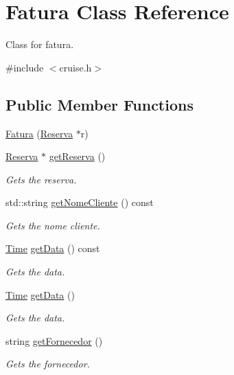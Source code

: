 \hypertarget{classFatura}{}\section{Fatura Class Reference}
\label{classFatura}


Class for fatura.  




{\ttfamily \#include $<$cruise.\+h$>$}

\subsection*{Public Member Functions}
\begin{DoxyCompactItemize}
\item 
\hyperlink{classFatura_a1f07f69dca302332c03e605c91df8c90}{Fatura} (\hyperlink{classReserva}{Reserva} $\ast$r)
\item 
\hyperlink{classReserva}{Reserva} $\ast$ \hyperlink{classFatura_aec7c7eb1220972655cd5318cae9a8b58}{get\+Reserva} ()
\begin{DoxyCompactList}\small\item\em Gets the reserva. \end{DoxyCompactList}\item 
std\+::string \hyperlink{classFatura_aa16421065127ac0fd15740b80dd1893b}{get\+Nome\+Cliente} () const 
\begin{DoxyCompactList}\small\item\em Gets the nome cliente. \end{DoxyCompactList}\item 
\hyperlink{classTime}{Time} \hyperlink{classFatura_af7d5b6d4f800887742a7bb1adbfecc65}{get\+Data} () const 
\begin{DoxyCompactList}\small\item\em Gets the data. \end{DoxyCompactList}\item 
\hyperlink{classTime}{Time} \hyperlink{classFatura_a8eb6e932de3351b6fca24e58397b02c6}{get\+Data} ()
\begin{DoxyCompactList}\small\item\em Gets the data. \end{DoxyCompactList}\item 
string \hyperlink{classFatura_a45efe8240f7ffc339ed1a34b2f928465}{get\+Fornecedor} ()
\begin{DoxyCompactList}\small\item\em Gets the fornecedor. \end{DoxyCompactList}\item 

\end{DoxyCompactItemize}
